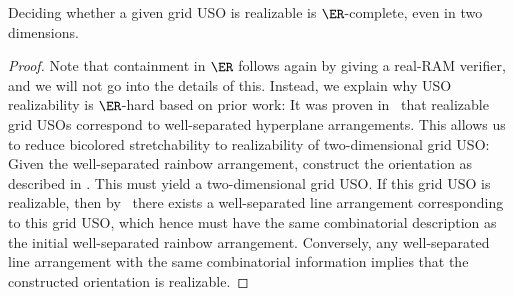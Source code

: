 %
\begin{corollary}
\label{corollary:grid_uso_hard}
    Deciding whether a given grid USO is realizable is $\ER$-complete, even in two dimensions.
\end{corollary}
\begin{proof}
    Note that containment in $\ER$ follows again by giving a real-RAM verifier, and we will not go into the details of this. Instead, we explain why USO realizability is $\ER$-hard based on prior work: It was proven in~\cite{borzechowskiTwoChoicesAre2024} that realizable grid USOs correspond to well-separated hyperplane arrangements. This allows us to reduce bicolored stretchability to realizability of two-dimensional grid USO: Given the well-separated rainbow arrangement, construct the orientation as described in . This must yield a two-dimensional grid USO. If this grid USO is realizable, then by~\cite{borzechowskiTwoChoicesAre2024} there exists a well-separated line arrangement corresponding to this grid USO, which hence must have the same combinatorial description as the initial well-separated rainbow arrangement. Conversely, any well-separated line arrangement with the same combinatorial information implies that the constructed orientation is realizable. 
\end{proof}
%
%
%
%
\appendix
%
